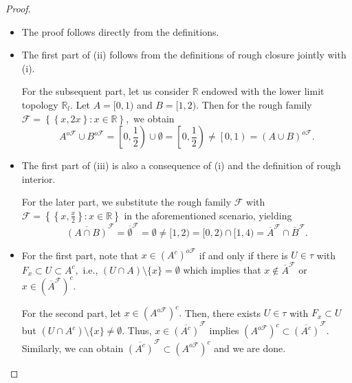 \documentclass[10pt,a4paper]{amsart}
\begin{document}
\begin{proof}
 \begin{itemize}
     \item[(i)]The proof follows directly from the definitions.
     
     \item[(ii)] The first part of (ii) follows from the definitions of rough closure jointly with (i). 
     
     For the subsequent part, let us consider $\mathbb{R}$ endowed with the lower limit topology $\mathbb{R}_l.$ Let $A=[0,1)$ and $B=[1,2).$ Then for the rough family $\mathscr{F}=\left\{\left\{x,2x\right\}: x\in \mathbb{R}\right\},$ we obtain $$A^{o\mathscr{F}}\cup B^{o\mathscr{F}}=\left[0,\frac{1}{2}\right)\cup\emptyset=\left[0,\frac{1}{2}\right)\neq \left[0,1\right)=(A\cup B)^{o\mathscr{F}}.$$
     
     \item[(iii)]  The first part of (iii) is also a consequence of (i) and the definition of rough interior.
     
     For the later part, we substitute the rough family $\mathscr{F}$ with $\mathscr{F}=\left\{\left\{x,\frac{x}{2}\right\}: x\in \mathbb{R}\right\}$ in the aforementioned scenario, yielding $$\overline{(A\cap B)}^\mathscr{F}=\overline{\emptyset}^\mathscr{F}=\emptyset\neq [1,2)=[0,2)\cap [1,4)=\overline{A}^\mathscr{F}\cap\overline{B}^\mathscr{F}.$$
     
     \item[(iv)]  For the first part, note that $x\in (A^c)^{o\mathscr{F}}$ if and only if there is $U\in \tau$ with $F_x\subset U\subset A^c,$ i.e., $(U\cap A)\setminus\{x\}=\emptyset$ which implies that $x\notin \overline{A}^\mathscr{F}$ or $x\in \left(\overline{A}^\mathscr{F}\right)^c$.

     For the second part, let $x\in \left(A^{o\mathscr{F}}\right)^c.$ Then, there exists $U\in \tau$ with $F_x\subset U$ but $\left(U\cap A^c\right)\setminus\{x\}\neq \emptyset$. Thus, $x\in \overline{(A^c)}^\mathscr{F}$ implies $\left(A^{o\mathscr{F}}\right)^c\subset \overline{(A^c)}^\mathscr{F}$. Similarly, we can obtain $\overline{(A^c)}^\mathscr{F}\subset \left(A^{o\mathscr{F}}\right)^c$ and we are done.
 \end{itemize}
\end{proof}
\end{document}
